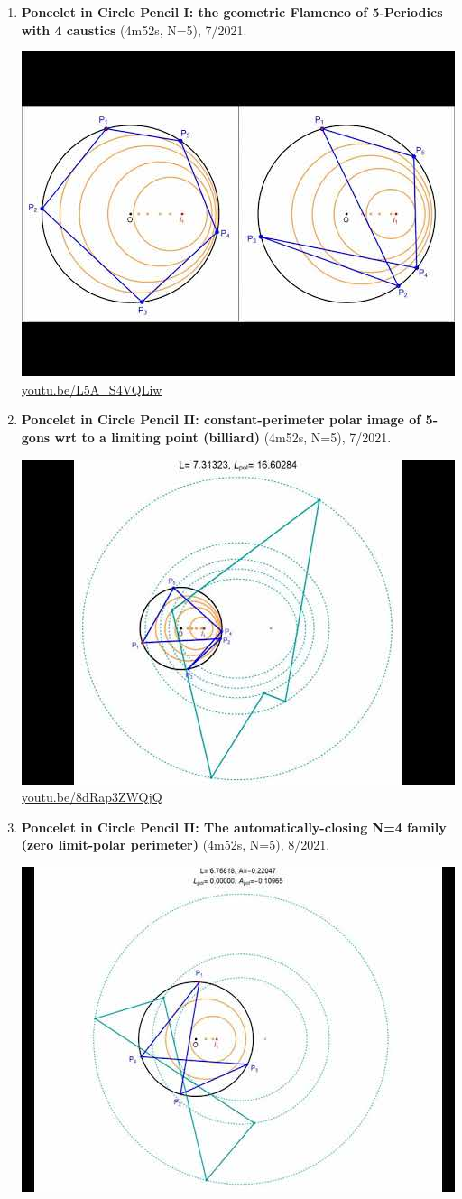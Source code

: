 \documentclass[12pt]{amsart}
\begin{document}
\begin{enumerate}[resume]
\item \textbf{Poncelet in Circle Pencil I: the geometric Flamenco of 5-Periodics with 4 caustics} (4m52s, N=5), 7/2021. 
\begin{center}\includegraphics[width=.5\textwidth]{pics/L5A_S4VQLiw.jpg} \\ 
\href{https://youtu.be/L5A_S4VQLiw}{\url{youtu.be/L5A\_S4VQLiw}}\end{center}
% 
\item \textbf{Poncelet in Circle Pencil II: constant-perimeter polar image of 5-gons wrt to a limiting point (billiard)} (4m52s, N=5), 7/2021. 
\begin{center}\includegraphics[width=.5\textwidth]{pics/8dRap3ZWQjQ.jpg} \\ 
\href{https://youtu.be/8dRap3ZWQjQ}{\url{youtu.be/8dRap3ZWQjQ}}\end{center}
% 
\item \textbf{Poncelet in Circle Pencil II: The automatically-closing N=4 family (zero limit-polar perimeter)} (4m52s, N=5), 8/2021. 
\begin{center}\includegraphics[width=.5\textwidth]{pics/-8CVK18UkM8.jpg} \\ 

\end{center}
\end{enumerate}
\end{document}
